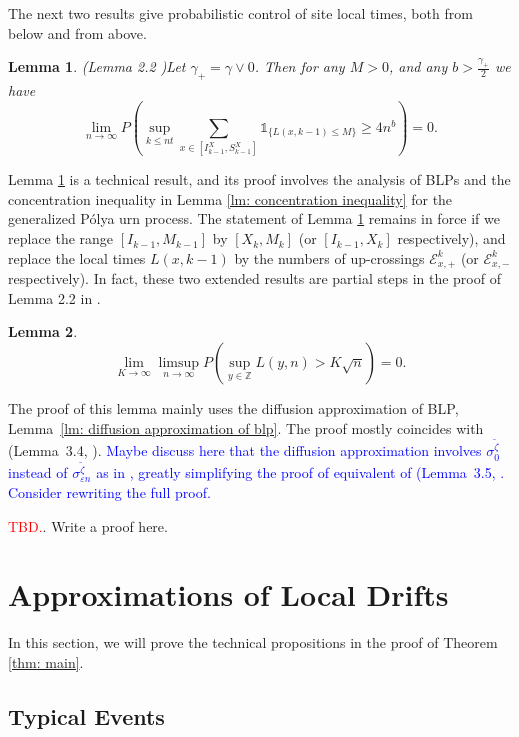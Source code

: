 \documentclass[twoside,12pt,a4paper]{article}
\newtheorem{lemma}{Lemma}[section]
\numberwithin{equation}{section}
\newcommand\TBD{\textcolor{red}{TBD.}}
\newcommand{\comment}[1]{\textcolor{blue}{#1}}
\begin{document}
	
	The next two results give probabilistic control of site local times, both from below and from above.
	
	\begin{lemma}(Lemma 2.2 \cite{KMP22})\label{lm: number of rarely visit sites}
		Let $\gamma_+ = \gamma \vee 0$. Then for any $M>0$, and any $b>\frac{\gamma_+}{2}$ we have
		$$
		\lim_{n\to\infty} P\left(\sup_{k\leq nt}  \sum_{x\in [I^X_{k-1}, S^X_{k-1}]} \mathbb{1}_{\{ L(x,k-1) \leq M \}} \geq 4n^b \right) = 0.
		$$
		
	\end{lemma}	
	Lemma \ref{lm: number of rarely visit sites} is a technical result, and its proof involves the analysis of BLPs and the concentration inequality in Lemma \ref{lm: concentration inequality} for the generalized P\'{o}lya urn process. The statement of Lemma \ref{lm: number of rarely visit sites} remains in force if we replace the range $[I_{k-1}, M_{k-1}]$ by $[X_k,M_k]$ (or $[I_{k-1},X_k]$ respectively), and replace the local times $L(x,k-1)$ by the numbers of up-crossings $\mathcal{E}^{k}_{x,+}$ (or $\mathcal{E}^{k}_{x,-}$ respectively). In fact, these two extended results are partial steps in the proof of Lemma 2.2 in \cite{KMP22}.   
	
	\begin{lemma}
		\label{lm: uniform control of local time}
		\[
		\lim_{K \to  \infty } \limsup_{n \to \infty } P\left( \sup_{y \in \mathbb{Z}} L\left( y, n \right) > K \sqrt{n}  \right) = 0
		.\] 
	\end{lemma}
	The proof of this lemma mainly uses the diffusion approximation of BLP, Lemma~\ref{lm: diffusion approximation of blp}. The proof mostly coincides with (Lemma~3.4, \cite{KP16}). 
	\comment{Maybe discuss here that the diffusion approximation involves $\sigma_0^{\tilde \zeta}$ instead of $\sigma_{\varepsilon n}^{\tilde \zeta}$ as in \cite{KP16}, greatly simplifying the proof of equivalent of (Lemma~3.5, \cite{KP16}. Consider rewriting the full proof.
	}
	
	\TBD. Write a proof here.
	
	
	\section{Approximations of Local Drifts}\label{sec: approximations}
	In this section, we will prove the technical propositions in the proof of Theorem \ref{thm: main}.
	
	\subsection{Typical Events}
	
\end{document}
